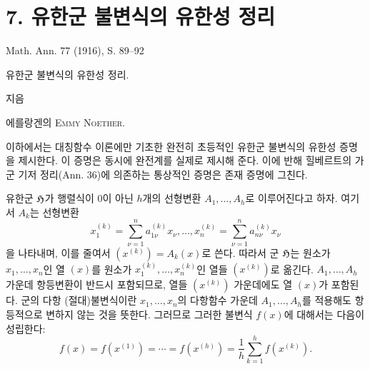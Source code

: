 
\section*{7. 유한군 불변식의 유한성 정리}
\begin{center}
Math. Ann. 77 (1916), S. 89--92
\end{center}

\begin{center}
{\Large 유한군 불변식의 유한성 정리.}\par
\vspace{1.2em}
지음\par
\vspace{0.8em}
에를랑겐의 {\scshape Emmy Noether}.
\end{center}

이하에서는 대칭함수 이론에만 기초한 완전히 초등적인 유한군 불변식의 유한성 증명을 제시한다. 이 증명은 동시에 완전계를 실제로 제시해 준다. 이에 반해 힐베르트의 가군 기저 정리(Ann. 36)에 의존하는 통상적인 증명은 존재 증명에 그친다.

유한군 $\mathfrak H$가 행렬식이 0이 아닌 $h$개의 선형변환 $A_1,\ldots,A_h$로 이루어진다고 하자. 여기서 $A_k$는 선형변환
\[
  x_1^{(k)}=\sum_{\nu=1}^{n}a_{1\nu}^{(k)}x_\nu,\ldots,
  x_n^{(k)}=\sum_{\nu=1}^{n}a_{n\nu}^{(k)}x_\nu
\]
을 나타내며, 이를 줄여서 $(x^{(k)})=A_k(x)$로 쓴다. 따라서 군 $\mathfrak H$는 원소가 $x_1,\ldots,x_n$인 열 $(x)$를 원소가 $x_1^{(k)},\ldots,x_n^{(k)}$인 열들 $(x^{(k)})$로 옮긴다. $A_1,\ldots,A_h$ 가운데 항등변환이 반드시 포함되므로, 열들 $(x^{(k)})$ 가운데에도 열 $(x)$가 포함된다. 군의 다항 (절대)불변식이란 $x_1,\ldots,x_n$의 다항함수 가운데 $A_1,\ldots,A_h$를 적용해도 항등적으로 변하지 않는 것을 뜻한다. 그러므로 그러한 불변식 $f(x)$에 대해서는 다음이 성립한다:
\begin{equation}
  f(x)=f(x^{(1)})=\cdots=f(x^{(h)})=
  \frac1h\sum_{k=1}^{h}f(x^{(k)}).
\tag{1}
\end{equation}

